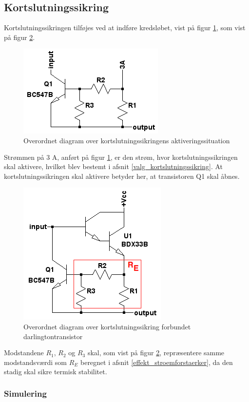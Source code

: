 \subsection{Kortslutningssikring}
\label{effekt_kortslutningssikring}
Kortslutningssikringen tilføjes ved at indføre kredsløbet, vist på figur \ref{fig:dia-kortslut}, som vist på figur \ref{fig:dia-kortslut1}. 

\begin{figure}[h]
\centering
\includegraphics[scale=1]{teknisk/effektforstaerker/diagram-kortslut.png}
\caption{Overordnet diagram over kortslutningssikringens aktiveringssituation}
\label{fig:dia-kortslut}
\end{figure}

Strømmen på 3 A, anført på figur \ref{fig:dia-kortslut}, er den strøm, hvor kortslutningssikringen skal aktivere, hvilket blev bestemt i afsnit \ref{valg_kortslutningssikring}. At kortslutningssikringen skal aktivere betyder her, at transistoren Q1 skal åbnes. 

\begin{figure}[h]
\centering
\includegraphics[scale=1]{teknisk/effektforstaerker/diagram-kortslut1.png}
\caption{Overordnet diagram over kortslutningssikring forbundet darlingtontransistor}
\label{fig:dia-kortslut1}
\end{figure}

Modstandene $R_1$, $R_2$ og $R_3$ skal, som vist på figur \ref{fig:dia-kortslut1}, repræsentere samme modstandsværdi som $R_E$ beregnet i afsnit \ref{effekt_stroemforstaerker}, da den stadig skal sikre termisk stabilitet. 

\subsubsection*{Simulering}